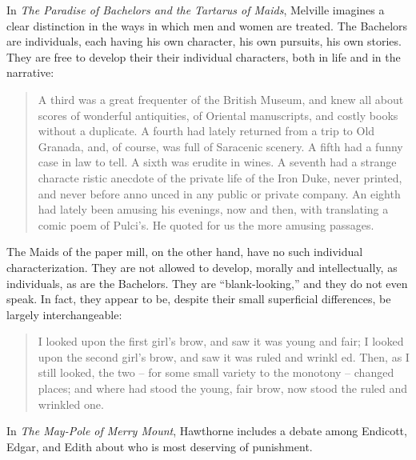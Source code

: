 \documentclass[man,12pt,natbib]{apa6}
\begin{document}
In \emph{The Paradise of Bachelors and the Tartarus of Maids}, Melville
imagines a clear distinction in the ways in which men and women are treated.
The Bachelors are individuals, each having his own character, his own pursuits,
his own stories. They are free to develop their their individual characters,
both in life and in the narrative:
\begin{quote}
	A third was a great frequenter of the British Museum, and knew all about
	scores of wonderful antiquities, of Oriental manuscripts, and costly books
	without a duplicate.  A fourth had lately returned from a trip to Old
	Granada, and, of course, was full of Saracenic scenery. A fifth had a funny
	case in law to tell. A sixth was erudite in wines. A seventh had a strange
	characte ristic anecdote of the private life of the Iron Duke, never
	printed, and never before anno unced in any public or private company. An
	eighth had lately been amusing his evenings, now and then, with translating
	a comic poem of Pulci's. He quoted for us the more amusing passages. 
\end{quote}

The Maids of the paper mill, on the other hand, have no such individual
characterization. They are not allowed to develop, morally and intellectually,
as individuals, as are the Bachelors. They are ``blank-looking,'' and they do
not even speak. In fact, they appear to be, despite their small superficial differences, be largely interchangeable:
\begin{quote}
	   I looked upon the first girl's brow, and saw it was young and fair; I
	   looked upon the second girl's brow, and saw it was ruled and wrinkl ed.
	   Then, as I still looked, the two -- for some small variety to the
	   monotony -- changed places; and where had stood the young, fair brow,
	   now stood the ruled and wrinkled 
one. 
\end{quote}

In \emph{The May-Pole of Merry Mount}, Hawthorne includes a debate among
Endicott, Edgar, and Edith about who is most deserving of punishment.

\nocite{Child12b, Melville12, Poe12b}

\clearpage

\end{document}
